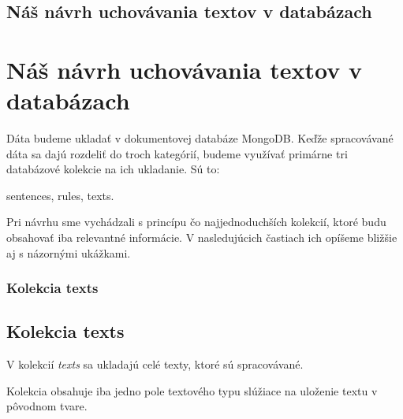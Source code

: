 %
%
{
	\subsection{Náš návrh uchovávania textov v databázach}
}
{
	\section{Náš návrh uchovávania textov v databázach}
}
\label{subsection:our_design_persisting_data}
Dáta budeme ukladať v dokumentovej databáze MongoDB. Keďže spracovávané dáta sa dajú rozdeliť do troch kategórií, budeme využívať primárne tri databázové kolekcie na ich ukladanie. Sú to:

\begin{my_itemize}
	\myitem sentences,
	\myitem rules,
	\myitem texts.
\end{my_itemize}
	
Pri návrhu sme vychádzali s princípu čo najjednoduchších kolekcií, ktoré budu obsahovať iba relevantné informácie.
V nasledujúcich častiach ich opíšeme bližšie aj s názornými ukážkami.

%
%
{
	\subsubsection{Kolekcia texts}
}
{
	\subsection{Kolekcia texts}
}
V kolekcií \textit{texts} sa ukladajú celé texty, ktoré sú spracovávané. 

Kolekcia obsahuje iba jedno pole textového typu slúžiace na uloženie textu v pôvodnom tvare.

